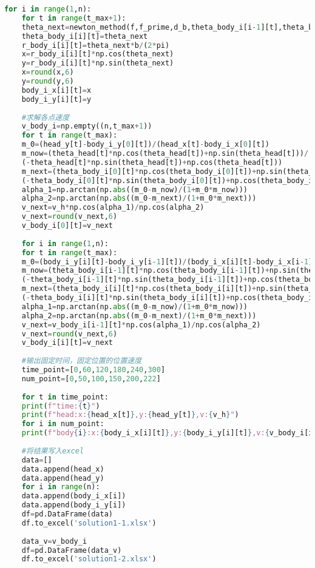 \documentclass[withoutpreface,bwprint]{cumcmthesis} %
\begin{document}
\begin{lstlisting}[language=Python]
	for i in range(1,n):
	for t in range(t_max+1):
	theta_next=newton_method(f,f_prime,d_b,theta_body_i[i-1][t],theta_body_i[i-1][t]+pi/2)
	theta_body_i[i][t]=theta_next
	r_body_i[i][t]=theta_next*b/(2*pi)
	x=r_body_i[i][t]*np.cos(theta_next)
	y=r_body_i[i][t]*np.sin(theta_next)
	x=round(x,6)
	y=round(y,6)
	body_i_x[i][t]=x
	body_i_y[i][t]=y
	
	#求解各点速度
	v_body_i=np.empty((n,t_max+1))
	for t in range(t_max):
	m_0=(head_y[t]-body_i_y[0][t])/(head_x[t]-body_i_x[0][t])
	m_now=(theta_head[t]*np.cos(theta_head[t])+np.sin(theta_head[t]))/
	(-theta_head[t]*np.sin(theta_head[t])+np.cos(theta_head[t]))
	m_next=(theta_body_i[0][t]*np.cos(theta_body_i[0][t])+np.sin(theta_body_i[0][t]))/
	(-theta_body_i[0][t]*np.sin(theta_body_i[0][t])+np.cos(theta_body_i[0][t]))
	alpha_1=np.arctan(np.abs((m_0-m_now)/(1+m_0*m_now)))
	alpha_2=np.arctan(np.abs((m_0-m_next)/(1+m_0*m_next)))
	v_next=v_h*np.cos(alpha_1)/np.cos(alpha_2)
	v_next=round(v_next,6)
	v_body_i[0][t]=v_next
	
	for i in range(1,n):
	for t in range(t_max):
	m_0=(body_i_y[i][t]-body_i_y[i-1][t])/(body_i_x[i][t]-body_i_x[i-1][t])
	m_now=(theta_body_i[i-1][t]*np.cos(theta_body_i[i-1][t])+np.sin(theta_body_i[i-1][t]))/
	(-theta_body_i[i-1][t]*np.sin(theta_body_i[i-1][t])+np.cos(theta_body_i[i-1][t]))
	m_next=(theta_body_i[i][t]*np.cos(theta_body_i[i][t])+np.sin(theta_body_i[i][t]))/
	(-theta_body_i[i][t]*np.sin(theta_body_i[i][t])+np.cos(theta_body_i[i][t]))
	alpha_1=np.arctan(np.abs((m_0-m_now)/(1+m_0*m_now)))
	alpha_2=np.arctan(np.abs((m_0-m_next)/(1+m_0*m_next)))
	v_next=v_body_i[i-1][t]*np.cos(alpha_1)/np.cos(alpha_2)
	v_next=round(v_next,6)
	v_body_i[i][t]=v_next
	
	#输出固定时间，固定位置的位置速度
	time_point=[0,60,120,180,240,300]
	num_point=[0,50,100,150,200,222]
	
	for t in time_point:
	print(f"time:{t}")
	print(f"head:x:{head_x[t]},y:{head_y[t]},v:{v_h}")
	for i in num_point:
	print(f"body{i}:x:{body_i_x[i][t]},y:{body_i_y[i][t]},v:{v_body_i[i][t]}")
	
	#将结果写入excel
	data=[]
	data.append(head_x)
	data.append(head_y)
	for i in range(n):
	data.append(body_i_x[i])
	data.append(body_i_y[i])
	df=pd.DataFrame(data)
	df.to_excel('solution1-1.xlsx')
	
	data_v=v_body_i
	df=pd.DataFrame(data_v)
	df.to_excel('solution1-2.xlsx')
	\end{lstlisting}
\end{document}
